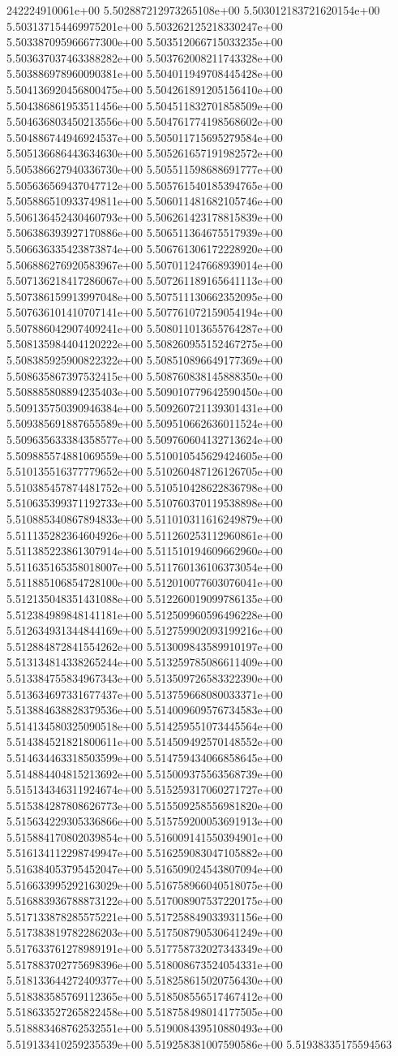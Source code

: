 242224910061e+00	5.502887212973265108e+00	5.503012183721620154e+00	5.503137154469975201e+00	5.503262125218330247e+00	5.503387095966677300e+00	5.503512066715033235e+00	5.503637037463388282e+00	5.503762008211743328e+00	5.503886978960090381e+00	5.504011949708445428e+00	5.504136920456800475e+00	5.504261891205156410e+00	5.504386861953511456e+00	5.504511832701858509e+00	5.504636803450213556e+00	5.504761774198568602e+00	5.504886744946924537e+00	5.505011715695279584e+00	5.505136686443634630e+00	5.505261657191982572e+00	5.505386627940336730e+00	5.505511598688691777e+00	5.505636569437047712e+00	5.505761540185394765e+00	5.505886510933749811e+00	5.506011481682105746e+00	5.506136452430460793e+00	5.506261423178815839e+00	5.506386393927170886e+00	5.506511364675517939e+00	5.506636335423873874e+00	5.506761306172228920e+00	5.506886276920583967e+00	5.507011247668939014e+00	5.507136218417286067e+00	5.507261189165641113e+00	5.507386159913997048e+00	5.507511130662352095e+00	5.507636101410707141e+00	5.507761072159054194e+00	5.507886042907409241e+00	5.508011013655764287e+00	5.508135984404120222e+00	5.508260955152467275e+00	5.508385925900822322e+00	5.508510896649177369e+00	5.508635867397532415e+00	5.508760838145888350e+00	5.508885808894235403e+00	5.509010779642590450e+00	5.509135750390946384e+00	5.509260721139301431e+00	5.509385691887655589e+00	5.509510662636011524e+00	5.509635633384358577e+00	5.509760604132713624e+00	5.509885574881069559e+00	5.510010545629424605e+00	5.510135516377779652e+00	5.510260487126126705e+00	5.510385457874481752e+00	5.510510428622836798e+00	5.510635399371192733e+00	5.510760370119538898e+00	5.510885340867894833e+00	5.511010311616249879e+00	5.511135282364604926e+00	5.511260253112960861e+00	5.511385223861307914e+00	5.511510194609662960e+00	5.511635165358018007e+00	5.511760136106373054e+00	5.511885106854728100e+00	5.512010077603076041e+00	5.512135048351431088e+00	5.512260019099786135e+00	5.512384989848141181e+00	5.512509960596496228e+00	5.512634931344844169e+00	5.512759902093199216e+00	5.512884872841554262e+00	5.513009843589910197e+00	5.513134814338265244e+00	5.513259785086611409e+00	5.513384755834967343e+00	5.513509726583322390e+00	5.513634697331677437e+00	5.513759668080033371e+00	5.513884638828379536e+00	5.514009609576734583e+00	5.514134580325090518e+00	5.514259551073445564e+00	5.514384521821800611e+00	5.514509492570148552e+00	5.514634463318503599e+00	5.514759434066858645e+00	5.514884404815213692e+00	5.515009375563568739e+00	5.515134346311924674e+00	5.515259317060271727e+00	5.515384287808626773e+00	5.515509258556981820e+00	5.515634229305336866e+00	5.515759200053691913e+00	5.515884170802039854e+00	5.516009141550394901e+00	5.516134112298749947e+00	5.516259083047105882e+00	5.516384053795452047e+00	5.516509024543807094e+00	5.516633995292163029e+00	5.516758966040518075e+00	5.516883936788873122e+00	5.517008907537220175e+00	5.517133878285575221e+00	5.517258849033931156e+00	5.517383819782286203e+00	5.517508790530641249e+00	5.517633761278989191e+00	5.517758732027343349e+00	5.517883702775698396e+00	5.518008673524054331e+00	5.518133644272409377e+00	5.518258615020756430e+00	5.518383585769112365e+00	5.518508556517467412e+00	5.518633527265822458e+00	5.518758498014177505e+00	5.518883468762532551e+00	5.519008439510880493e+00	5.519133410259235539e+00	5.519258381007590586e+00	5.51938335175594563